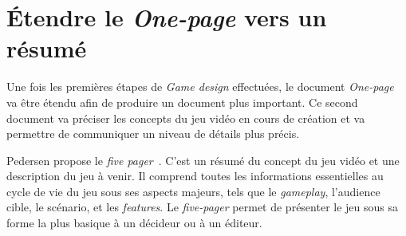 \section{Étendre le \emph{One-page} vers un résumé}
Une fois les premières étapes de \emph{Game design} effectuées, le document \emph{One-page} va être étendu afin de produire un document plus important. Ce second document va préciser les concepts du jeu vidéo en cours de création et va permettre de communiquer un niveau de détails plus précis.

Pedersen propose le \emph{five pager}~\cite{GD_foundations_pedersen}. C'est un résumé du concept du jeu vidéo et une description du jeu à venir. Il comprend toutes les informations essentielles au cycle de vie du jeu sous ses aspects majeurs, tels que le \emph{gameplay}, l'audience cible, le scénario, et les \emph{features}. Le \emph{five-pager} permet de présenter le jeu sous sa forme la plus basique à un décideur ou à un éditeur.






